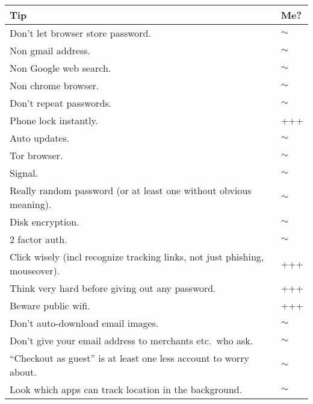 \documentclass{tufte-handout}
\begin{document}
\begin{tabular}{p{5in}l}

\textbf{Tip} & \textbf{Me?} \\
\hline

Don't let browser store password. & $\sim$ \\

Non gmail address. & $\sim$ \\

Non Google web search. & $\sim$ \\

Non chrome browser. & $\sim$ \\

Don't repeat passwords. & $\sim$ \\

Phone lock instantly. & +++ \\

Auto updates. & $\sim$ \\

Tor browser. & $\sim$ \\

Signal. & $\sim$ \\

Really random password (or at least one without obvious meaning). & $\sim$ \\

Disk encryption. & $\sim$ \\

2 factor auth. & $\sim$ \\

Click wisely (incl recognize tracking links, not just phishing, mouseover). & +++ \\

Think very hard before giving out any password. & +++ \\

Beware public wifi. & +++ \\

Don't auto-download email images. & $\sim$ \\

Don't give your email address to merchants etc.\ who ask. & $\sim$ \\

``Checkout as guest'' is at least one less account to worry about. & $\sim$ \\

Look which apps can track location in the background. & $\sim$ \\


\end{tabular}
\end{document}
